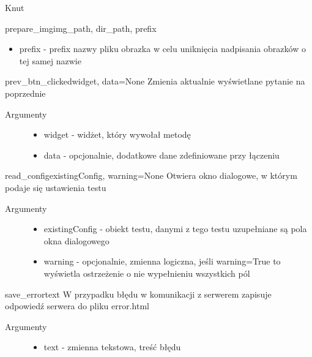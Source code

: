 \documentclass[letterpaper,10pt,polish]{manual}
\begin{document}
\begin{classdesc}{Knut}{}
\begin{methoddesc}{prepare\_img}{img\_path, dir\_path, prefix}
\begin{description}
\begin{itemize}
\item {} 
prefix - prefix nazwy pliku obrazka w celu uniknięcia nadpisania obrazków o tej samej nazwie

\end{itemize}

\end{description}
\end{methoddesc}

\hypertarget{Knut.Knut.prev\_btn\_clicked}{}\begin{methoddesc}{prev\_btn\_clicked}{widget, data=None}
Zmienia aktualnie wyświetlane pytanie na poprzednie
\begin{description}
\item[Argumenty] \leavevmode\begin{itemize}
\item {} 
widget - widżet, który wywołał metodę

\item {} 
data - opcjonalnie, dodatkowe dane zdefiniowane przy łączeniu

\end{itemize}

\end{description}
\end{methoddesc}

\hypertarget{Knut.Knut.read\_config}{}\begin{methoddesc}{read\_config}{existingConfig, warning=None}
Otwiera okno dialogowe, w którym podaje się ustawienia testu
\begin{description}
\item[Argumenty] \leavevmode\begin{itemize}
\item {} 
existingConfig - obiekt testu, danymi z tego testu uzupełniane są pola okna dialogowego

\item {} 
warning - opcjonalnie, zmienna logiczna, jeśli warning=True to wyświetla ostrzeżenie o nie wypełnieniu wszystkich pól

\end{itemize}

\end{description}
\end{methoddesc}

\hypertarget{Knut.Knut.save\_error}{}\begin{methoddesc}{save\_error}{text}
W przypadku błędu w komunikacji z serwerem zapisuje odpowiedź serwera do pliku error.html
\begin{description}
\item[Argumenty] \leavevmode\begin{itemize}
\item {} 
text - zmienna tekstowa, treść błędu


\end{itemize}
\end{description}
\end{methoddesc}
\end{classdesc}
\end{document}
